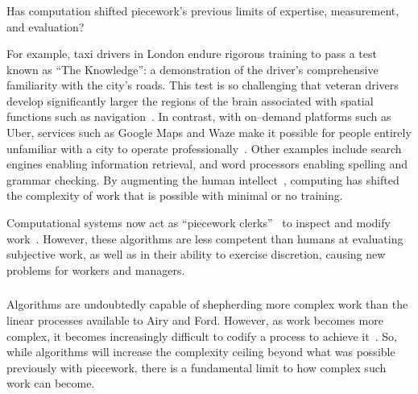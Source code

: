 \documentclass[pn4226]{subfiles}
\begin{document}
\subsubsection{\whatchanged}
\begin{comment}
  mangeerial overhead limits, so what's different
  more people can now do complex work without training (more complex)
  parts of management can be automated (more firms)
  cheaper to create the infrastructure (more complex)
\end{comment}

Has computation shifted piecework's previous limits of
expertise, measurement, and evaluation?

For example, taxi drivers in London endure rigorous training to pass a test known as ``The Knowledge'': a demonstration of the driver's comprehensive familiarity with the city's roads.
This test is so challenging that veteran drivers develop significantly larger
the regions of the brain associated with spatial functions such as navigation~\cite{Maguire11042000,Maguire2894,Skok:1999:KML:299513.299625,skok2000managing,Woollett1407,woollett2011acquiring}.
In contrast, with on--demand platforms such as Uber, services such as Google Maps and Waze make it possible for
people entirely unfamiliar with a city
to operate professionally~\cite{silva2013traffic,hind2014outsmarting}.
Other examples include search engines enabling information retrieval, and
word processors enabling spelling and grammar checking.
By augmenting the human intellect~\cite{engelbart2001augmenting},
computing has shifted the complexity of work that is possible with minimal or no training.

Computational systems now act as ``piecework clerks''~\cite{10.2307/23702539} to
inspect and modify work~\cite{turkopticon,takingAHITMcInnis}.
However, these algorithms are less competent than humans at evaluating subjective work, as well as
in their ability to exercise discretion, causing new problems for workers and managers.

\subsubsection{\implication}
Algorithms are undoubtedly capable of shepherding more complex work than the linear processes available to Airy and Ford.
However, as work becomes more complex,
it becomes increasingly difficult to codify a process to achieve it~\cite{Faraj2006a,edmondson2012teaming}.
So, while algorithms will increase the complexity ceiling beyond what was possible previously with piecework, there is a fundamental limit to how complex such work can become.
\end{document}
